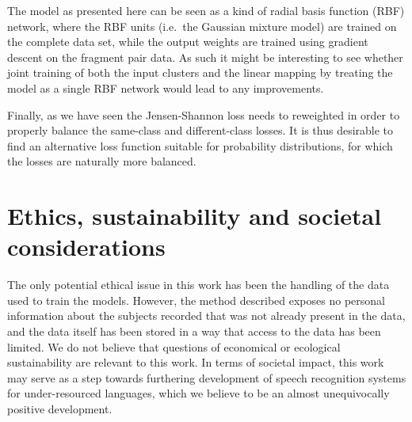 The model as presented here can be seen as a kind of radial basis function (RBF) network, where the RBF units (i.e.\ the Gaussian mixture model) are trained on the complete data set, while the output weights are trained using gradient descent on the fragment pair data.
As such it might be interesting to see whether joint training of both the input clusters and the linear mapping by treating the model as a single RBF network would lead to any improvements.

Finally, as we have seen the Jensen-Shannon loss needs to reweighted in order to properly balance the same-class and different-class losses.
It is thus desirable to find an alternative loss function suitable for probability distributions, for which the losses are naturally more balanced.

\section{Ethics, sustainability and societal considerations}

The only potential ethical issue in this work has been the handling of the data used to train the models.
However, the method described exposes no personal information about the subjects recorded that was not already present in the data, and the data itself has been stored in a way that access to the data has been limited.
We do not believe that questions of economical or ecological sustainability are relevant to this work.
In terms of societal impact, this work may serve as a step towards furthering development of speech recognition systems for under-resourced languages, which we believe to be an almost unequivocally positive development.

